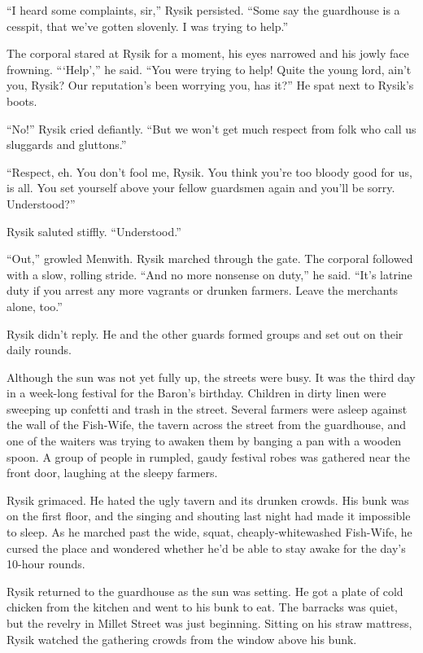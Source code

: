 \documentclass[10pt,a4paper]{article}
\begin{document}
``I heard some complaints, sir,'' Rysik persisted. ``Some say the
guardhouse is a cesspit, that we've gotten slovenly. I was trying
to help.''

The corporal stared at Rysik for a moment, his eyes narrowed and
his jowly face frowning. ```Help','' he said. ``You were trying to
help! Quite the young lord, ain't you, Rysik? Our reputation's been
worrying you, has it?'' He spat next to Rysik's boots.

``No!'' Rysik cried defiantly. ``But we won't get much respect from
folk who call us sluggards and gluttons.''

``Respect, eh. You don't fool me, Rysik. You think you're too bloody
good for us, is all. You set yourself above your fellow guardsmen
again and you'll be sorry. Understood?''

Rysik saluted stiffly. ``Understood.''

``Out,'' growled Menwith. Rysik marched through the gate. The corporal
followed with a slow, rolling stride. ``And no more nonsense on
duty,'' he said. ``It's latrine duty if you arrest any more vagrants
or drunken farmers. Leave the merchants alone, too.''

Rysik didn't reply. He and the other guards formed groups and set
out on their daily rounds.

Although the sun was not yet fully up, the streets were busy. It
was the third day in a week-long festival for the Baron's birthday.
Children in dirty linen were sweeping up confetti and trash in
the street. Several farmers were asleep against the wall of the
Fish-Wife, the tavern across the street from the guardhouse, and
one of the waiters was trying to awaken them by banging a pan with
a wooden spoon. A group of people in rumpled, gaudy festival robes
was gathered near the front door, laughing at the sleepy farmers.

Rysik grimaced. He hated the ugly tavern and its drunken crowds.
His bunk was on the first floor, and the singing and shouting last
night had made it impossible to sleep. As he marched past the
wide, squat, cheaply-whitewashed Fish-Wife, he cursed the place
and wondered whether he'd be able to stay awake for the day's
10-hour rounds.

\bigskip

Rysik returned to the guardhouse as the sun was setting. He got a
plate of cold chicken from the kitchen and went to his bunk to eat.
The barracks was quiet, but the revelry in Millet Street was just
beginning. Sitting on his straw mattress, Rysik watched the gathering
crowds from the window above his bunk.
\end{document}
